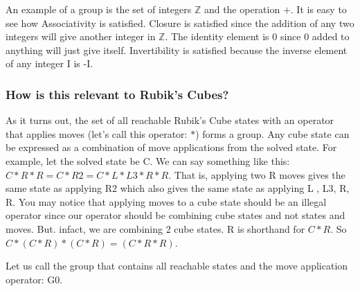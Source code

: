 \documentclass[titlepage]{report}[12pt]
\begin{document}
An example of a group is the set of integers \begin{math}\mathbb{Z}\end{math} and the operation \begin{math} + \end{math}. It is easy to see how Associativity is satisfied. Closure is satisfied since the addition of any two integers will give another integer in \begin{math}\mathbb{Z}\end{math}. The identity element is 0 since 0 added to anything will just give itself. Invertibility is satisfied because the inverse element of any integer I is -I.

\subsubsection{How is this relevant to Rubik's Cubes?}
As it turns out, the set of all reachable Rubik's Cube states with an operator that applies moves (let's call this operator: \begin{math} * \end{math}) forms a group.
Any cube state can be expressed as a combination of move applications from the solved state. For example, let the solved state be C. We can say something like this: \begin{math} C*R*R = C*R2=C*L*L3*R*R \end{math}. That is, applying two R moves gives the same state as applying R2 which also gives the same state as applying L , L3, R, R. You may notice that applying moves to a cube state should be an illegal operator since our operator should be combining cube states and not states and moves. But. infact, we are combining 2 cube states. R is shorthand for \begin{math} C * R \end{math}. So \begin{math}C * (C * R) * (C * R) = (C* R * R)\end{math}.

Let us call the group that contains all reachable states and the move application operator: G0.
\end{document}
